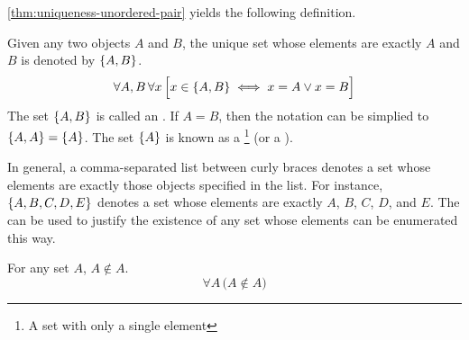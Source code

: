 \vspace{0.3cm}
\noindent \cref{thm:uniqueness-unordered-pair} yields the following definition.
\begin{dfn}
    \label{dfn:unordered-pair}
    Given any two objects \( A \) and \( B \), the unique set whose elements are exactly
    \( A \) and \( B \) is denoted by \( \mleft\{ A, B \mright\} \).
    \begin{equation*}
        \forall A,B \, \forall x \, \Big[ x \in \mleft\{ A, B \mright\} \iff x = A \lor x = B \Big]
    \end{equation*}
    The set \( \mleft\{ A, B \mright\} \) is called an . If \( A = B \),
    then the notation can be simplied to \( \mleft\{ A, A \mright\} = \mleft\{ A \mright\} \).
    The set \( \mleft\{ A \mright\} \) is known as a \footnote{A set with only a single element}
    (or a ).
\end{dfn}

\begin{rem}
    In general, a comma-separated list between curly braces denotes a set whose elements
    are exactly those objects specified in the list. For instance, \( \mleft\{ A,B,C,D,E \mright\} \) denotes
    a set whose elements are exactly \( A \), \( B \), \( C \), \( D \), and \( E \). The 
    can be used to justify the existence of any set whose elements can be enumerated this way.
\end{rem}

\begin{thm}
    \label{thm:no-set-is-an-element-of-itself}
    For any set \( A \), \( A \notin A \).
    \begin{equation*}
        \forall A \, \big( A \notin A \big)
    \end{equation*}
\end{thm}

